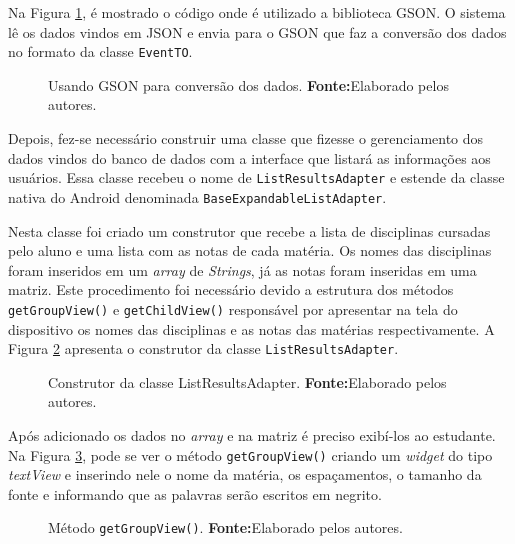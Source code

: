 	\par Na Figura \ref{fig:app11}, é mostrado o código onde é utilizado a
	biblioteca GSON. O sistema lê os dados vindos em JSON e envia para o GSON que faz a conversão dos
dados no formato da classe \texttt{EventTO}.

	\begin{figure}[h!] 
		
		\caption[Usando GSON para conversão dos dados]{Usando GSON para conversão dos dados.
		\textbf{Fonte:}Elaborado pelos autores.}
		\label{fig:app11}
	\end{figure}
	
	\par Depois, fez-se necessário construir uma classe que fizesse o gerenciamento
dos dados vindos do banco de dados com a interface que listará as informações
aos usuários. Essa classe recebeu o nome de \texttt{ListResultsAdapter} e
estende da classe nativa do Android denominada
\texttt{BaseExpandableListAdapter}.

	\par Nesta classe foi criado um construtor que recebe a lista de disciplinas
cursadas pelo aluno e uma lista com as notas de cada matéria. Os nomes das
disciplinas foram inseridos em um \textit{array} de \textit{Strings}, já as
notas foram inseridas em uma matriz. Este procedimento foi necessário devido a
estrutura dos métodos \texttt{getGroupView()} e \texttt{getChildView()}
responsável por apresentar na tela do dispositivo os nomes das disciplinas e as
notas das matérias respectivamente.  A Figura \ref{fig:app12} apresenta o
construtor da classe \texttt{ListResultsAdapter}.

	\begin{figure}[h!] 
		
		\caption[Construtor da classe ListResultsAdapter]{Construtor da classe ListResultsAdapter.
		\textbf{Fonte:}Elaborado pelos autores.}
		\label{fig:app12}
	\end{figure}

	\par Após adicionado os dados no \textit{array} e na matriz é preciso exibí-los
ao estudante. Na Figura \ref{fig:app13}, pode se ver o método \texttt{getGroupView()}
criando um \textit{widget} do tipo \textit{textView}  e inserindo nele o nome
da matéria, os espaçamentos, o tamanho da fonte e informando que as palavras
serão escritos em negrito.

	\begin{figure}[h!] 
		
		\caption[Método getGroupView()]{Método \texttt{getGroupView()}.
		\textbf{Fonte:}Elaborado pelos autores.}
		\label{fig:app13}
	\end{figure}
	
